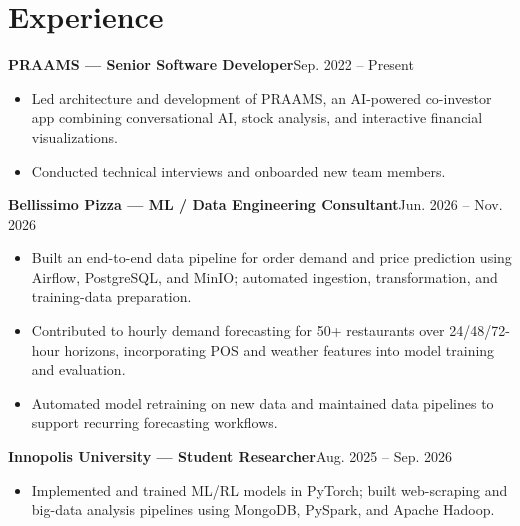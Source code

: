 \documentclass[11pt]{article}
\newcommand{\entry}[2]{\textbf{#1}\hfill #2\par}
\begin{document}
\section{Experience}
\entry{PRAAMS --- Senior Software Developer}{Sep. 2022 -- Present}
\begin{itemize}
    \item Led architecture and development of PRAAMS, an AI-powered co-investor app combining conversational AI, stock analysis, and interactive financial visualizations.
    \item Conducted technical interviews and onboarded new team members.
\end{itemize}
\vspace{3pt}
\entry{Bellissimo Pizza --- ML / Data Engineering Consultant}{Jun. 2026 -- Nov. 2026}
\begin{itemize}
    \item Built an end-to-end data pipeline for order demand and price prediction using Airflow, PostgreSQL, and MinIO; automated ingestion, transformation, and training-data preparation.
    \item Contributed to hourly demand forecasting for 50+ restaurants over 24/48/72-hour horizons, incorporating POS and weather features into model training and evaluation.
    \item Automated model retraining on new data and maintained data pipelines to support recurring forecasting workflows.
\end{itemize}
\vspace{3pt}
\entry{Innopolis University --- Student Researcher}{Aug. 2025 -- Sep. 2026}
\begin{itemize}
    \item Implemented and trained ML/RL models in PyTorch; built web-scraping and big-data analysis pipelines using MongoDB, PySpark, and Apache Hadoop.
\end{itemize}
\end{document}
